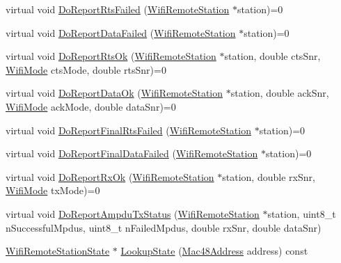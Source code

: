\begin{DoxyCompactItemize}
\item 
virtual void \hyperlink{classns3_1_1WifiRemoteStationManager_ab825ef773e7d251f0e157624a49c7041}{Do\+Report\+Rts\+Failed} (\hyperlink{structns3_1_1WifiRemoteStation}{Wifi\+Remote\+Station} $\ast$station)=0
\item 
virtual void \hyperlink{classns3_1_1WifiRemoteStationManager_a38a4401b6232cb547f5a85337e02b12c}{Do\+Report\+Data\+Failed} (\hyperlink{structns3_1_1WifiRemoteStation}{Wifi\+Remote\+Station} $\ast$station)=0
\item 
virtual void \hyperlink{classns3_1_1WifiRemoteStationManager_a33a010f86ce5e68ceda2a0abbf21b71e}{Do\+Report\+Rts\+Ok} (\hyperlink{structns3_1_1WifiRemoteStation}{Wifi\+Remote\+Station} $\ast$station, double cts\+Snr, \hyperlink{classns3_1_1WifiMode}{Wifi\+Mode} cts\+Mode, double rts\+Snr)=0
\item 
virtual void \hyperlink{classns3_1_1WifiRemoteStationManager_a9328ead6b0b4ad50fbd589b286a84c21}{Do\+Report\+Data\+Ok} (\hyperlink{structns3_1_1WifiRemoteStation}{Wifi\+Remote\+Station} $\ast$station, double ack\+Snr, \hyperlink{classns3_1_1WifiMode}{Wifi\+Mode} ack\+Mode, double data\+Snr)=0
\item 
virtual void \hyperlink{classns3_1_1WifiRemoteStationManager_aed2a605fb30d7fc31638eae3f8ee7403}{Do\+Report\+Final\+Rts\+Failed} (\hyperlink{structns3_1_1WifiRemoteStation}{Wifi\+Remote\+Station} $\ast$station)=0
\item 
virtual void \hyperlink{classns3_1_1WifiRemoteStationManager_a32e2a7a9f651b5224b5c037c14598cf7}{Do\+Report\+Final\+Data\+Failed} (\hyperlink{structns3_1_1WifiRemoteStation}{Wifi\+Remote\+Station} $\ast$station)=0
\item 
virtual void \hyperlink{classns3_1_1WifiRemoteStationManager_ade990f17f78d8fc32c736b91a2557b25}{Do\+Report\+Rx\+Ok} (\hyperlink{structns3_1_1WifiRemoteStation}{Wifi\+Remote\+Station} $\ast$station, double rx\+Snr, \hyperlink{classns3_1_1WifiMode}{Wifi\+Mode} tx\+Mode)=0
\item 
virtual void \hyperlink{classns3_1_1WifiRemoteStationManager_a25709c3fb16dbf9c07170a952d33415f}{Do\+Report\+Ampdu\+Tx\+Status} (\hyperlink{structns3_1_1WifiRemoteStation}{Wifi\+Remote\+Station} $\ast$station, uint8\+\_\+t n\+Successful\+Mpdus, uint8\+\_\+t n\+Failed\+Mpdus, double rx\+Snr, double data\+Snr)
\item 
\hyperlink{structns3_1_1WifiRemoteStationState}{Wifi\+Remote\+Station\+State} $\ast$ \hyperlink{classns3_1_1WifiRemoteStationManager_aa92633f587338f32789e9210c82c6815}{Lookup\+State} (\hyperlink{classns3_1_1Mac48Address}{Mac48\+Address} address) const 

\end{DoxyCompactItemize}
